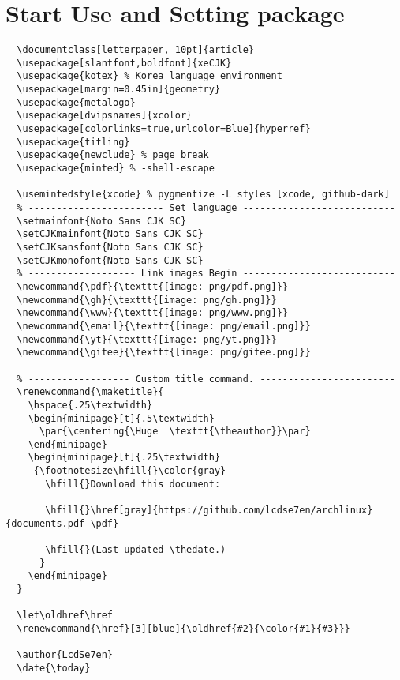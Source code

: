 \section{Start Use and Setting package \textcolor{green}{} \textcolor{blue}{}  \textcolor{cyan}{} }


\begin{verbatim}
  \documentclass[letterpaper, 10pt]{article}
  \usepackage[slantfont,boldfont]{xeCJK}
  \usepackage{kotex} % Korea language environment
  \usepackage[margin=0.45in]{geometry}
  \usepackage{metalogo}
  \usepackage[dvipsnames]{xcolor}
  \usepackage[colorlinks=true,urlcolor=Blue]{hyperref}
  \usepackage{titling}
  \usepackage{newclude} % page break
  \usepackage{minted} % -shell-escape

  \usemintedstyle{xcode} % pygmentize -L styles [xcode, github-dark]
  % ------------------------ Set language ---------------------------
  \setmainfont{Noto Sans CJK SC}
  \setCJKmainfont{Noto Sans CJK SC}
  \setCJKsansfont{Noto Sans CJK SC}
  \setCJKmonofont{Noto Sans CJK SC}
  % ------------------- Link images Begin ---------------------------
  \newcommand{\pdf}{\texttt{[image: png/pdf.png]}}
  \newcommand{\gh}{\texttt{[image: png/gh.png]}}
  \newcommand{\www}{\texttt{[image: png/www.png]}}
  \newcommand{\email}{\texttt{[image: png/email.png]}}
  \newcommand{\yt}{\texttt{[image: png/yt.png]}}
  \newcommand{\gitee}{\texttt{[image: png/gitee.png]}}

  % ------------------ Custom title command. ------------------------
  \renewcommand{\maketitle}{
    \hspace{.25\textwidth}
    \begin{minipage}[t]{.5\textwidth}
      \par{\centering{\Huge  \texttt{\theauthor}}\par}
    \end{minipage}
    \begin{minipage}[t]{.25\textwidth}
     {\footnotesize\hfill{}\color{gray}
       \hfill{}Download this document:

       \hfill{}\href[gray]{https://github.com/lcdse7en/archlinux}{documents.pdf \pdf}

       \hfill{}(Last updated \thedate.)
      }
    \end{minipage}
  }

  \let\oldhref\href
  \renewcommand{\href}[3][blue]{\oldhref{#2}{\color{#1}{#3}}}

  \author{LcdSe7en}
  \date{\today}
\end{verbatim}

